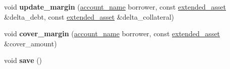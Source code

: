 \begin{DoxyCompactItemize}
\item 
\mbox{\label{structaacio_1_1market__state_a5752ff0510cfa0fc3845d8eba3bff3fb}} 
void {\bfseries update\+\_\+margin} (\mbox{\hyperlink{structaacio_1_1chain_1_1name}{account\+\_\+name}} borrower, const \mbox{\hyperlink{structaacio_1_1extended__asset}{extended\+\_\+asset}} \&delta\+\_\+debt, const \mbox{\hyperlink{structaacio_1_1extended__asset}{extended\+\_\+asset}} \&delta\+\_\+collateral)
\item 
\mbox{\label{structaacio_1_1market__state_af940702a7eecf14d54894586e60cd427}} 
void {\bfseries cover\+\_\+margin} (\mbox{\hyperlink{structaacio_1_1chain_1_1name}{account\+\_\+name}} borrower, const \mbox{\hyperlink{structaacio_1_1extended__asset}{extended\+\_\+asset}} \&cover\+\_\+amount)
\item 
\mbox{\label{structaacio_1_1market__state_a282b844b33ef19fb9b81232b6bcb0201}} 
void {\bfseries save} ()
\end{DoxyCompactItemize}
